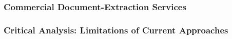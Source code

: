 \subsubsection{Commercial Document-Extraction Services}


\subsubsection{Critical Analysis: Limitations of Current Approaches}


